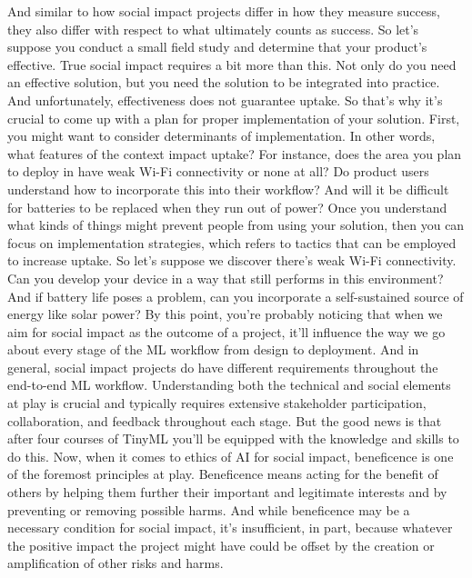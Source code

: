 {{{{{{{{    And similar to how social impact projects differ
    in how they measure success, they also differ with respect
    to what ultimately counts as success.
    So let's suppose you conduct a small field study
    and determine that your product's effective.
    True social impact requires a bit more than this.
    Not only do you need an effective solution,
    but you need the solution to be integrated into practice.
    And unfortunately, effectiveness does not guarantee uptake.
    So that's why it's crucial to come up with a plan for proper implementation
    of your solution.
    First, you might want to consider determinants of implementation.
    In other words, what features of the context impact uptake?
    For instance, does the area you plan to deploy in
    have weak Wi-Fi connectivity or none at all?
    Do product users understand how to incorporate this into their workflow?
    And will it be difficult for batteries to be
    replaced when they run out of power?
    Once you understand what kinds of things might prevent people
    from using your solution, then you can focus
    on implementation strategies, which refers to tactics that
    can be employed to increase uptake.
    So let's suppose we discover there's weak Wi-Fi connectivity.
    Can you develop your device in a way that
    still performs in this environment?
    And if battery life poses a problem, can you
    incorporate a self-sustained source of energy like solar power?
    By this point, you're probably noticing that when we aim for social impact
    as the outcome of a project, it'll influence
    the way we go about every stage of the ML workflow from design to deployment.
    And in general, social impact projects do have different requirements
    throughout the end-to-end ML workflow.
    Understanding both the technical and social elements at play
    is crucial and typically requires extensive stakeholder participation,
    collaboration, and feedback throughout each stage.
    But the good news is that after four courses of TinyML
    you'll be equipped with the knowledge and skills to do this.
    Now, when it comes to ethics of AI for social impact,
    beneficence is one of the foremost principles at play.
    Beneficence means acting for the benefit of others
    by helping them further their important and legitimate interests
    and by preventing or removing possible harms.
    And while beneficence may be a necessary condition for social impact,
    it's insufficient, in part, because whatever
    the positive impact the project might have
    could be offset by the creation or amplification of other risks and harms.
}}}}}}}}
